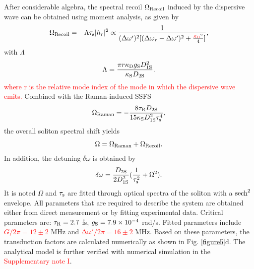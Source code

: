 \documentclass[noshowpacs,amsmath,
twocolumn,
superscriptaddress,
8pt,
aps,prb]{revtex4-2}
\begin{document}
\begin{footnotesize}
After considerable algebra, the spectral recoil $\Omega_{\rm Recoil}$ induced by the dispersive wave can be obtained using moment analysis, as given by \cite{yi2017single}
\begin{equation}
    \Omega_{\rm Recoil}=-\Lambda \tau_{\rm s} |h_{r}|^{2}
    \propto
    \frac{1}{(\Delta\omega')^{2}[(\mathrm{\Delta\omega}_r-\mathrm{\Delta\omega'})^{2}+\frac{\textcolor{red}{\kappa_{\rm B}}^{2}}{4}]},
    \label{Recoil}
\end{equation}
with $\Lambda$ 
\begin{equation}
    \Lambda
    =
    \frac{\pi r \kappa_{\rm D} g_{\rm S} D_{1\rm S}^2}{\kappa_{\rm S} D_{2\rm S}}.
\end{equation}
\textcolor{red}{where r is the relative mode index of the mode in which the dispersive wave emits. } Combined with the Raman-induced SSFS \cite{yi2016theory}
\begin{equation}
    \Omega_{\rm Raman}=-\frac{8\tau_{\rm R} D_{\rm 2S}}{15 \kappa_{\rm S}D_{1\rm S}^{2}\tau_{\rm s}^4},
    \label{PulseWidth}
\end{equation}
the overall soliton spectral shift yields
\begin{equation}
    \Omega=\Omega_{\rm Raman}+\Omega_{\rm Recoil}.
    \label{FrequencyShift}
\end{equation}
In addition, the detuning $\delta \omega$ is obtained by \cite{yi2016theory,yi2017single}
\begin{equation}
    \mathrm{\delta \omega}=\frac{D_{2\rm S}}{2D_{1\rm S}^{2}}(\frac{1}{\tau_{\rm s}^{2}}+\Omega^{2}).
    \label{Detuning}
\end{equation}
It is noted $\Omega$ and $\tau_{\rm s}$ are fitted through optical spectra of the soliton with a ${\rm sech}^2$ envelope. All parameters that are required to describe the system are obtained either from direct measurement or by fitting experimental data. Critical parameters are: $\tau_{\rm R}=2.7$ fs, $g_{\rm S}=7.9\times10^{-4}$ rad/s. Fitted parameters include \textcolor{red}{$G/2\pi=12\pm 2$} MHz and \textcolor{red}{$\mathrm{\Delta \omega'}/2\pi=16\pm 2$} MHz. Based on these parameters, the transduction factors are calculated numerically as shown in Fig. \ref{figure5}d. The analytical model is further verified with numerical simulation in the \textcolor{red}{Supplementary note I}.

\medskip



\end{footnotesize}
\end{document}
